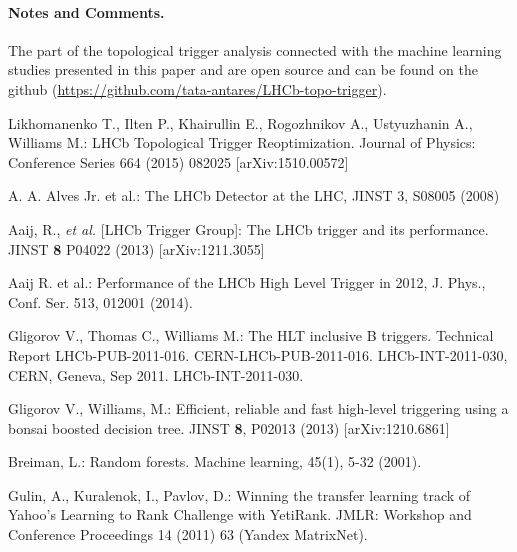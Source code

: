\documentclass{llncs}
\begin{document}
\paragraph{Notes and Comments.}
The part of the topological trigger analysis connected with the machine learning studies presented in this paper and \cite{run2_topo} are open source and can be found on the github (\url{https://github.com/tata-antares/LHCb-topo-trigger}).
%
%
\begin{thebibliography}{5}
%
 Likhomanenko T., Ilten P., Khairullin E., Rogozhnikov A., Ustyuzhanin A., Williams M.: 
LHCb Topological Trigger Reoptimization. Journal of Physics: Conference Series 664 (2015) 082025 [arXiv:1510.00572]

  A. A. Alves Jr. et al.: The LHCb Detector at the LHC, JINST 3, S08005 (2008)

 Aaij, R., {\em et al.} [LHCb Trigger Group]: 
The LHCb trigger and its performance.
JINST {\bf 8} P04022 (2013) [arXiv:1211.3055]

 Aaij R. et al.: 
Performance of the LHCb High Level Trigger in 2012, J. Phys., Conf. Ser. 513, 012001 (2014).

 Gligorov V., Thomas C., Williams M.: 
The HLT inclusive B triggers. Technical Report
LHCb-PUB-2011-016. CERN-LHCb-PUB-2011-016. LHCb-INT-2011-030, CERN, Geneva, Sep 2011. LHCb-INT-2011-030.

 Gligorov V., Williams, M.:
Efficient, reliable and fast high-level triggering using a bonsai boosted decision tree.
JINST {\bf 8}, P02013 (2013) [arXiv:1210.6861]

 Breiman, L.: 
Random forests. Machine learning, 45(1), 5-32 (2001).

 Gulin, A., Kuralenok, I., Pavlov, D.:
Winning the transfer learning track of Yahoo's Learning to Rank Challenge with YetiRank.
JMLR: Workshop and Conference Proceedings 14 (2011) 63 (Yandex MatrixNet).






\end{thebibliography}
\end{document}
